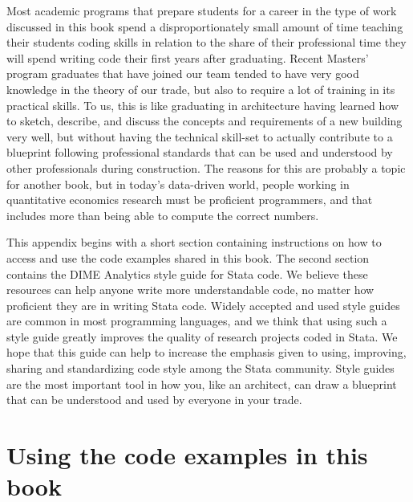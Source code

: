 
\begin{fullwidth}

Most academic programs that prepare students for a career
in the type of work discussed in this book
spend a disproportionately small amount of time teaching their students coding skills
in relation to the share of their professional time they will spend writing code
their first years after graduating.
Recent Masters' program graduates that have joined our team
tended to have very good knowledge in the theory of our
trade, but also to require a lot of training in its practical skills.
To us, this is like graduating  in architecture having learned
how to sketch, describe, and discuss
the concepts and requirements of a new building very well,
but without having the technical skill-set
to actually contribute to a blueprint following professional standards
that can be used and understood by other professionals during construction.
The reasons for this are probably a topic for another book,
but in today's data-driven world,
people working in quantitative economics research must be proficient programmers,
and that includes more than being able to compute the correct numbers.

This appendix begins with a short section containing instructions
on how to access and use the code examples shared in this book.
The second section contains the DIME Analytics style guide for Stata code.
We believe these resources can help anyone write more understandable code,
no matter how proficient they are in writing Stata code.
Widely accepted and used style guides are common in most programming languages,
and we think that using such a style guide greatly improves the quality
of research projects coded in Stata.
We hope that this guide can  help to increase the emphasis
given to using, improving, sharing and standardizing code style among the Stata community.
Style guides are the most important tool in how you, like an architect,
can draw a blueprint that can be understood and used by everyone in your trade.

\end{fullwidth}


\section{Using the code examples in this book}

